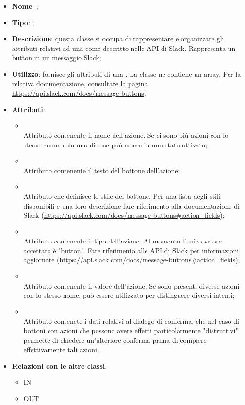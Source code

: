 \begin{itemize}
	\item \textbf{Nome}: ;
	\item \textbf{Tipo}: ;
	\item \textbf{Descrizione}: questa classe si occupa di rappresentare e organizzare gli attributi relativi ad una  come descritto nelle API di Slack. Rappresenta un button in un messaggio Slack;
	\item \textbf{Utilizzo}: fornisce gli attributi di una . La classe  ne contiene un array.
Per la relativa documentazione, consultare la pagina \url{https://api.slack.com/docs/message-buttons};
	\item \textbf{Attributi}:
	\begin{itemize}
		\item[]  \\
		Attributo contenente il nome dell'azione. Se ci sono più azioni con lo stesso nome, solo una di esse può essere in uno stato attivato;
		\item[]  \\
		Attributo contenente il testo del bottone dell'azione;
		\item[]  \\
		Attributo che definisce lo stile del bottone. Per una lista degli stili disponibili e una loro descrizione fare riferimento alla documentazione di Slack (\url{https://api.slack.com/docs/message-buttons#action_fields});
		\item[]  \\
		Attributo contenente il tipo dell'azione. Al momento l'unico valore accettato è "button". Fare riferimento alle API di   Slack per informazioni aggiornate (\url{https://api.slack.com/docs/message-buttons#action_fields});
		\item[]  \\
		Attributo contenente il valore dell'azione. Se sono presenti diverse azioni con lo stesso nome, può essere utilizzato per distinguere diversi intenti;
		\item[]  \\
		Attributo contenete i dati relativi al dialogo di conferma, che nel caso di bottoni con azioni che possono avere effetti particolarmente "distruttivi" permette di chiedere un'ulteriore conferma prima di compiere effettivamente tali azioni;
	\end{itemize}
	\item \textbf{Relazioni con le altre classi}:
	\begin{itemize}
		\item IN \hyperlink{Attachment_label}{}
		\item OUT \hyperlink{ConfirmationFields_label}{}
	\end{itemize}
\end{itemize}
\FloatBarrier

